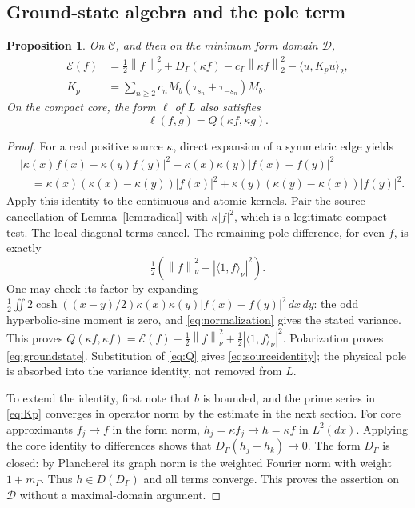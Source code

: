 \documentclass[11pt,a4paper]{article}
\numberwithin{equation}{section}
\newtheorem{proposition}[theorem]{Proposition}
\theoremstyle{definition}\newtheorem{definition}[theorem]{Definition}
\theoremstyle{remark}\newtheorem{remark}[theorem]{Remark}
\newcommand{\DD}{\mathcal D}
\newcommand{\EE}{\mathcal E}
\newcommand{\ip}[2]{\langle #1,#2\rangle}
\newcommand{\norm}[1]{\left\|#1\right\|}
\newcommand{\abs}[1]{\left|#1\right|}
\begin{document}
\subsection{Ground-state algebra and the pole term}
\begin{proposition}\label{prop:sourceidentity}
On $\mathcal C$, and then on the minimum form domain $\DD$,
\begin{align}\label{eq:sourceidentity}
 \EE(f)&=\tfrac12\norm f_\nu^2+D_\Gamma(\kappa f)
 -c_\Gamma\norm{\kappa f}_2^2-\ip u{K_pu}_2,\\
 K_p&=\sum_{n\ge2}c_nM_b(\tau_{s_n}+\tau_{-s_n})M_b.\label{eq:Kp}
\end{align}
On the compact core, the form $\ell$ of $L$ also satisfies
\begin{equation}\label{eq:groundstate}
 \ell(f,g)=Q(\kappa f,\kappa g).
\end{equation}
\end{proposition}
\begin{proof}
For a real positive source $\kappa$, direct expansion of a symmetric edge yields
\[
 \begin{aligned}
 &|\kappa(x)f(x)-\kappa(y)f(y)|^2
 -\kappa(x)\kappa(y)|f(x)-f(y)|^2\\
 &\quad=\kappa(x)(\kappa(x)-\kappa(y))|f(x)|^2
  +\kappa(y)(\kappa(y)-\kappa(x))|f(y)|^2.
 \end{aligned}
\]
Apply this identity to the continuous and atomic kernels. Pair the source cancellation of Lemma~\ref{lem:radical} with $\kappa|f|^2$, which is a legitimate compact test. The local diagonal terms cancel. The remaining pole difference, for even $f$, is exactly
\[
 \tfrac12\left(\norm f_\nu^2-\abs{\ip1f_\nu}^2\right).
\]
One may check its factor by expanding
$\tfrac12\iint2\cosh((x-y)/2)\kappa(x)\kappa(y)|f(x)-f(y)|^2\,dx\,dy$:
the odd hyperbolic-sine moment is zero, and \eqref{eq:normalization} gives the stated variance. This proves $Q(\kappa f,\kappa f)=\EE(f)-\tfrac12\norm f_\nu^2+\tfrac12|\ip1f_\nu|^2$. Polarization proves \eqref{eq:groundstate}. Substitution of \eqref{eq:Q} gives \eqref{eq:sourceidentity}; the physical pole is absorbed into the variance identity, not removed from $L$.

To extend the identity, first note that $b$ is bounded, and the prime series in \eqref{eq:Kp} converges in operator norm by the estimate in the next section. For core approximants $f_j\to f$ in the form norm, $h_j=\kappa f_j\to h=\kappa f$ in $L^2(dx)$. Applying the core identity to differences shows that $D_\Gamma(h_j-h_k)\to0$. The form $D_\Gamma$ is closed: by Plancherel its graph norm is the weighted Fourier norm with weight $1+m_\Gamma$. Thus $h\in D(D_\Gamma)$ and all terms converge. This proves the assertion on $\DD$ without a maximal-domain argument.
\end{proof}
\end{document}
